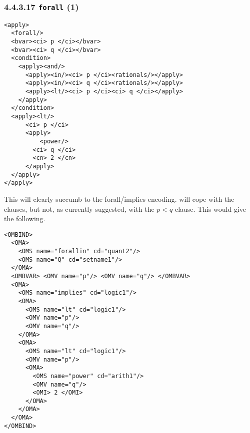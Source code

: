 \documentclass{llncs}
\begin{document}
{\subsubsection{4.4.3.17 {\tt forall} (1)}\label{443171}
\begin{lstlisting}[language=MathML2]
<apply>
  <forall/>
  <bvar><ci> p </ci></bvar>
  <bvar><ci> q </ci></bvar>
  <condition>
    <apply><and/>
      <apply><in/><ci> p </ci><rationals/></apply>
      <apply><in/><ci> q </ci><rationals/></apply>
      <apply><lt/><ci> p </ci><ci> q </ci></apply>
    </apply>
  </condition>
  <apply><lt/>
      <ci> p </ci>
      <apply>
          <power/>
        <ci> q </ci>
        <cn> 2 </cn>
      </apply>
  </apply>
</apply>
\end{lstlisting}
This will clearly succumb to the forall/implies encoding.
{} will cope with the
{} clauses, but not, as
currently suggested, with the $p<q$ clause. This would give the following.
\begin{lstlisting}
<OMBIND>
  <OMA>
    <OMS name="forallin" cd="quant2"/>
    <OMS name="Q" cd="setname1"/>
  </OMA>
  <OMBVAR> <OMV name="p"/> <OMV name="q"/> </OMBVAR>
  <OMA>
    <OMS name="implies" cd="logic1"/>
    <OMA>
      <OMS name="lt" cd="logic1"/>
      <OMV name="p"/>
      <OMV name="q"/> 
    </OMA>
    <OMA>
      <OMS name="lt" cd="logic1"/>
      <OMV name="p"/>
      <OMA>
        <OMS name="power" cd="arith1"/>
        <OMV name="q"/> 
        <OMI> 2 </OMI>
      </OMA>
    </OMA>
  </OMA>
</OMBIND>
\end{lstlisting}
}
\end{document}
